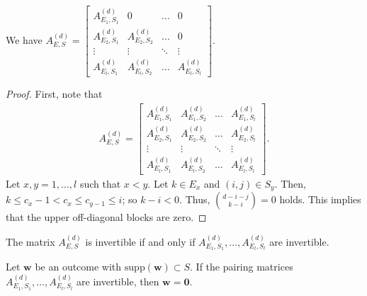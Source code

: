 \begin{proposition}
    We have \( A_{E,S}^{(d)} = 
    \begin{bmatrix}
        A_{E_1,S_1}^{(d)} & 0 & \dots & 0 \\
        A_{E_2,S_1}^{(d)} & A_{E_2,S_2}^{(d)} & \dots & 0 \\
        \vdots & \vdots & \ddots & \vdots \\
        A_{E_l,S_1}^{(d)} & A_{E_l,S_2}^{(d)} & \dots & A_{E_l,S_l}^{(d)}
    \end{bmatrix} \).
\end{proposition}

\begin{proof}
    First, note that 
    \begin{align*}
        A_{E,S}^{(d)} = 
        \begin{bmatrix}
            A_{E_1,S_1}^{(d)} & A_{E_1,S_2}^{(d)} & \dots & A_{E_1,S_l}^{(d)} \\
            A_{E_2,S_1}^{(d)} & A_{E_2,S_2}^{(d)} & \dots & A_{E_2,S_l}^{(d)} \\
            \vdots & \vdots & \ddots & \vdots \\
            A_{E_l,S_1}^{(d)} & A_{E_l,S_2}^{(d)} & \dots & A_{E_l,S_l}^{(d)}
        \end{bmatrix}.
    \end{align*}
    Let \( x,y = 1, \dots , l \) such that \( x < y \). Let \( k \in E_x \) and \( (i,j) \in S_y \).
    Then, \( k \leq c_x - 1 < c_x \leq c_{y - 1} \leq i \); so \( k - i < 0 \). Thus, \( \binom{d-i-j}{k-i} = 0 \) holds. This implies that the upper off-diagonal blocks are zero.
\end{proof}

\begin{corollary}
    The matrix \( A^{(d)}_{E,S} \) is invertible if and only if \( A^{(d)}_{E_1,S_1}, \dots,  A^{(d)}_{E_l,S_l} \) are invertible.
\end{corollary}

\begin{corollary}
    Let \( \mathbf{w} \) be an outcome with \( \mathrm{supp}(\mathbf w) \subset S \).
    If the pairing matrices \( A^{(d)}_{E_1,S_1}, \dots,  A^{(d)}_{E_l,S_l} \) are invertible, then \( \mathbf{w} = \mathbf 0 \).
\end{corollary}

